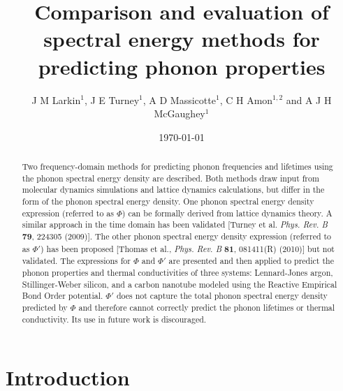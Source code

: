 \documentclass[12pt,twocolumn,iop]{/usr/share/texmf-texlive/tex/latex/iop/iopart}[/usr/share/texmf-texlive/tex/latex/iop/]
\begin{document}
\title{Comparison and evaluation of spectral energy methods for predicting phonon properties}

\author{J M Larkin$^1$, J E Turney$^1$,
A D Massicotte$^1$, C H Amon$^{1,2}$  and A J H McGaughey$^1$ }

\address{$^1$ Department of Mechanical Engineering\\Carnegie Mellon University\\Pittsburgh, PA 15213}
\address{$^2$ Department of Mechanical \& Industrial Engineering, University of Toronto, Toronto, Ontario, Canada M5S 3G8}


\date{\today}

\begin{abstract}
Two frequency-domain methods for predicting phonon frequencies and lifetimes
using the phonon spectral energy density are described. Both methods draw
input from molecular dynamics simulations and lattice dynamics calculations,
but differ in the form of the phonon spectral energy density.
One phonon spectral energy density expression (referred to as $\Phi$) can be
formally derived from lattice dynamics theory. A similar approach in the
time domain has been validated [Turney et al. \emph{Phys. Rev. B} \textbf{79}, 224305
(2009)]. The other phonon spectral energy density expression (referred to as
$\Phi'$) has been proposed [Thomas et al., \emph{Phys. Rev. B} \textbf{81}, 081411(R) (2010)]
but not validated. The expressions for $\Phi$ and $\Phi'$ are presented and then
applied to predict the phonon properties and thermal conductivities of three
systems: Lennard-Jones argon, Stillinger-Weber silicon, and a carbon
nanotube modeled using the Reactive Empirical Bond Order potential. $\Phi'$ does not capture the total
phonon spectral energy density predicted by $\Phi$ and therefore cannot
correctly predict the phonon lifetimes or thermal conductivity. Its use in
future work is discouraged.
\end{abstract}


\submitto{\JPCM}

\maketitle


\section{\label{Section_Introduction}Introduction}
\end{document}

